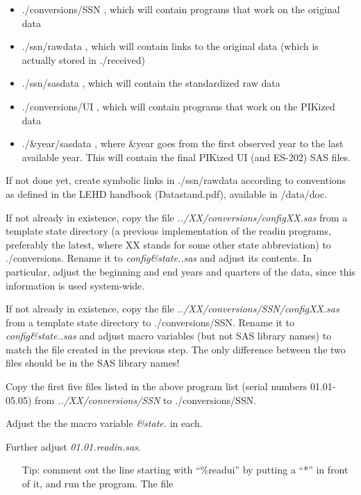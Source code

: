 \begin{description}
\begin{steps}
  \begin{itemize}
  \item ./conversions/SSN , which will contain programs that work on the
    original data
  \item ./ssn/rawdata , which will contain links to the original data
    (which is actually stored in ./received)
  \item ./ssn/sasdata , which will contain the standardized raw data
  \item ./conversions/UI , which will contain programs that work on the
    PIKized data
  \item ./\&year/sasdata , where \&year goes from the first observed year
    to the last available year. This will contain the final PIKized UI (and
    ES-202) SAS files.
\end{itemize}
\item If not done yet, create symbolic links in ./ssn/rawdata according to
  conventions as defined in the LEHD  handbook
  (Datastand.pdf), available in /data/doc.
\item If not already in existence, copy the file
  \textit{../XX/conversions/configXX.sas} from a template state directory
  (a previous implementation of the readin programs, preferably the latest,
  where XX stands for some other state abbreviation) to ./conversions.
  Rename it to \textit{config\&state..sas} and
  adjust its contents. In particular, adjust the beginning and end years
  and quarters of the data, since this information is used system-wide.
\item If not already in existence, copy the file
  \textit{../XX/conversions/SSN/configXX.sas} from a template state
  directory to ./conversions/SSN. Rename it to \textit{config\&state..sas}
  and adjust macro variables (but not SAS library names) to match the file
  created in the previous step. The only difference between the two files
  should be in the SAS library names!
\item Copy the first five files listed in the above program list (serial
  numbers 01.01-05.05) from  \textit{../XX/conversions/SSN} 
  to ./conversions/SSN. 
\item Adjust the the macro variable \textit{\&state.} in
  each. 
\item Further adjust \textit{01.01.readin.sas}. 
  \begin{itemize}
  \item[Tip:] comment out the line starting with ``\%readui'' by putting a
    ``*'' in front of it, and run the program. The file

\end{itemize}
\end{steps}
\end{description}
